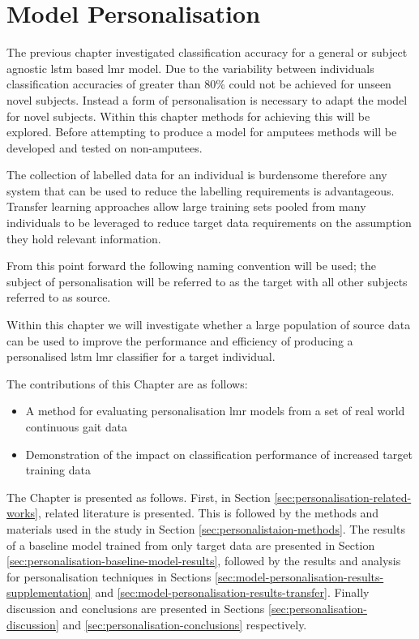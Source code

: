 \chapter{Model Personalisation}
\label{chp:personalisation}
The previous chapter investigated classification accuracy for a general or subject agnostic \acrshort{lstm} based \acrshort{lmr} model. Due to the variability between individuals classification accuracies of greater than 80\% could not be achieved for unseen novel subjects. Instead a form of personalisation is necessary to adapt the model for novel subjects. Within this chapter methods for achieving this will be explored. Before attempting to produce a model for amputees methods will be developed and tested on non-amputees.

The collection of labelled data for an individual is burdensome therefore any system that can be used to reduce the labelling requirements is advantageous. Transfer learning approaches allow large training sets pooled from many individuals to be leveraged to reduce target data requirements on the assumption they hold relevant information.\cite{Fallahzadeh2017, Schneider2021}

From this point forward the following naming convention will be used; the subject of personalisation will be referred to as the target with all other subjects referred to as source.

Within this chapter we will investigate whether a large population of source data can be used to improve the performance and efficiency of producing a personalised \acrshort{lstm} \acrshort{lmr} classifier for a target individual.

The contributions of this Chapter are as follows:
\begin{itemize}
    \item A method for evaluating personalisation \acrshort{lmr} models from a set of real world continuous gait data
    \item Demonstration of the impact on classification performance of increased target training data
\end{itemize}

The Chapter is presented as follows. First, in Section \ref{sec:personalisation-related-works}, related literature is presented. This is followed by the methods and materials used in the study in Section \ref{sec:personalistaion-methods}. The results of a baseline model trained from only target data are presented in Section \ref{sec:personalisation-baseline-model-results}, followed by the results and analysis for personalisation techniques in Sections \ref{sec:model-personalisation-results-supplementation} and \ref{sec:model-personalisation-results-transfer}. Finally discussion and conclusions are presented in Sections \ref{sec:personalisation-discussion} and \ref{sec:personalisation-conclusions} respectively.

